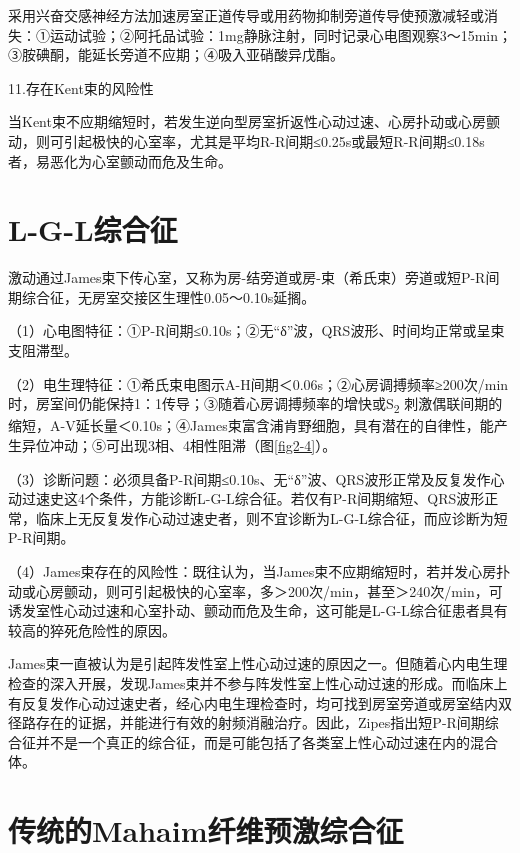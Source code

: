 采用兴奋交感神经方法加速房室正道传导或用药物抑制旁道传导使预激减轻或消失：①运动试验；②阿托品试验：1mg静脉注射，同时记录心电图观察3～15min；③胺碘酮，能延长旁道不应期；④吸入亚硝酸异戊酯。

11.存在Kent束的风险性

当Kent束不应期缩短时，若发生逆向型房室折返性心动过速、心房扑动或心房颤动，则可引起极快的心室率，尤其是平均R-R间期≤0.25s或最短R-R间期≤0.18s者，易恶化为心室颤动而危及生命。

\protect\hypertarget{text00036.htmlux5cux23subid419}{}{}

\section{L-G-L综合征}

激动通过James束下传心室，又称为房-结旁道或房-束（希氏束）旁道或短P-R间期综合征，无房室交接区生理性0.05～0.10s延搁。

（1）心电图特征：①P-R间期≤0.10s；②无“δ”波，QRS波形、时间均正常或呈束支阻滞型。

（2）电生理特征：①希氏束电图示A-H间期＜0.06s；②心房调搏频率≥200次/min时，房室间仍能保持1：1传导；③随着心房调搏频率的增快或S\textsubscript{2}
刺激偶联间期的缩短，A-V延长量＜0.10s；④James束富含浦肯野细胞，具有潜在的自律性，能产生异位冲动；⑤可出现3相、4相性阻滞（图\ref{fig2-4}）。

（3）诊断问题：必须具备P-R间期≤0.10s、无“δ”波、QRS波形正常及反复发作心动过速史这4个条件，方能诊断L-G-L综合征。若仅有P-R间期缩短、QRS波形正常，临床上无反复发作心动过速史者，则不宜诊断为L-G-L综合征，而应诊断为短P-R间期。

（4）James束存在的风险性：既往认为，当James束不应期缩短时，若并发心房扑动或心房颤动，则可引起极快的心室率，多＞200次/min，甚至＞240次/min，可诱发室性心动过速和心室扑动、颤动而危及生命，这可能是L-G-L综合征患者具有较高的猝死危险性的原因。

James束一直被认为是引起阵发性室上性心动过速的原因之一。但随着心内电生理检查的深入开展，发现James束并不参与阵发性室上性心动过速的形成。而临床上有反复发作心动过速史者，经心内电生理检查时，均可找到房室旁道或房室结内双径路存在的证据，并能进行有效的射频消融治疗。因此，Zipes指出短P-R间期综合征并不是一个真正的综合征，而是可能包括了各类室上性心动过速在内的混合体。

\protect\hypertarget{text00036.htmlux5cux23subid420}{}{}

\section{传统的Mahaim纤维预激综合征}

